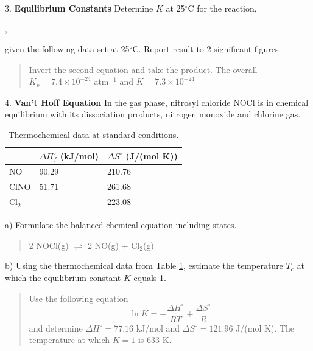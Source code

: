 \documentclass[11pt]{article}
\newcommand{\brian}[1]{
  {\begin{quote}
      \color{blue} #1
  \end{quote}}
}
\begin{document}
3. \textbf{Equilibrium Constants} Determine $K$ at 25$^\circ$C
for the reaction,
\begin{center}
  ,
\end{center}
given the following data set at 25$^\circ$C. Report result to 2 significant figures.
\begin{center}


\end{center}

\brian{Invert the second equation and take the product. The overall $K_p = 7.4\times 10^{-24}$ atm$^{-1}$
  and $K = 7.3\times 10^{-24}$
}


4. \textbf{Van't Hoff Equation} In the gas phase, nitrosyl chloride NOCl is in chemical
equilibrium with its dissociation products, nitrogen monoxide and chlorine gas.

\begin{table}[hbpt]
  \centering
  \begin{tabular}{lll}
      & $\Delta H^\circ_f$ (kJ/mol) & $\Delta S^\circ$ (J/(mol K)) \\
      \hline
      NO     & 90.29 & 210.76 \\
      ClNO   & 51.71 & 261.68 \\
      Cl$_2$ &       & 223.08
  \end{tabular}
  \caption{Thermochemical data at standard conditions.}
  \label{tab:therm}
\end{table}

a) Formulate the balanced chemical equation including states.

\brian{2 NOCl(g) $\rightleftharpoons$ 2 NO(g) + Cl$_2$(g)}

b) Using the thermochemical data from Table \ref{tab:therm}, estimate the temperature $T_c$
at which the equilibrium constant $K$ equals 1.

\brian{Use the following equation
  \begin{equation*}
      \ln K = -\frac{\Delta H^\circ}{RT} + \frac{\Delta S^\circ}{R}
  \end{equation*}
  and determine $\Delta H^\circ = 77.16$ kJ/mol and $\Delta S^\circ=121.96$ J/(mol K). The
  temperature at which $K=1$ is 633 K.
}
\end{document}
